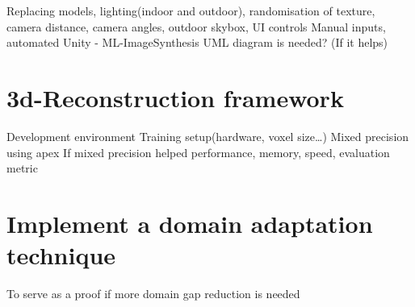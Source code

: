 Replacing models, lighting(indoor and outdoor), randomisation of texture, camera distance, camera angles, outdoor skybox,
UI controls
Manual inputs, automated
Unity - ML-ImageSynthesis
UML diagram is needed? (If it helps)

\section{3d-Reconstruction framework}
Development environment
Training setup(hardware, voxel size…)
Mixed precision using apex
If mixed precision helped performance, memory, speed, evaluation metric


\section{Implement a domain adaptation technique}
To serve as a proof if more domain gap reduction is needed
